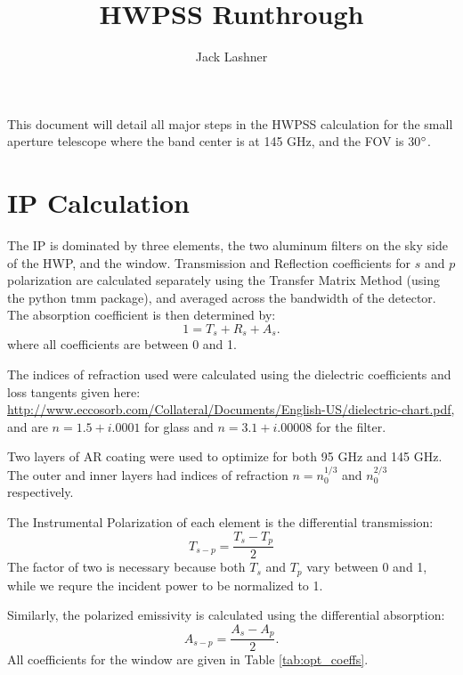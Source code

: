\documentclass{article}
\title{HWPSS Runthrough}
\author{Jack Lashner}
\date{}
\theoremstyle{remark}
\begin{document}
\maketitle

This document will detail all major steps in the HWPSS calculation for the small aperture telescope where the band center is at 145 GHz, and the FOV is 30$\degree$.

\section{IP Calculation}
The IP is dominated by three elements, the two aluminum filters on the sky side of the HWP, and the window.
Transmission and Reflection coefficients for $s$ and $p$ polarization are calculated separately using the Transfer Matrix Method (using the python tmm package), and averaged across the bandwidth of the detector.
The absorption coefficient is then determined by:
\[1 = T_s + R_s + A_s.\]
where all coefficients are between 0 and 1.

The indices of refraction used were calculated using the dielectric coefficients and loss tangents given here: \url{http://www.eccosorb.com/Collateral/Documents/English-US/dielectric-chart.pdf}, and are $n = 1.5 + i .0001$ for glass and $n=3.1 +i .00008$ for the filter.

Two layers of AR coating were used to optimize for both 95 GHz and 145 GHz. 
The outer and inner layers had indices of refraction $n = n_0^{1/3}$ and $n_0^{2/3}$ respectively.



The Instrumental Polarization of each element is the differential transmission:
\[T_{s - p} = \frac{T_s - T_p}{2}\]
The factor of two is necessary because both $T_s$ and $T_p$ vary between 0 and 1, 
while we requre the incident power to be normalized to 1.

Similarly, the polarized emissivity is calculated using the differential absorption:
\[A_{s - p} = \frac{A_s - A_p}{2} .\]
All coefficients for the window are given in Table \ref{tab:opt_coeffs}.
\end{document}
